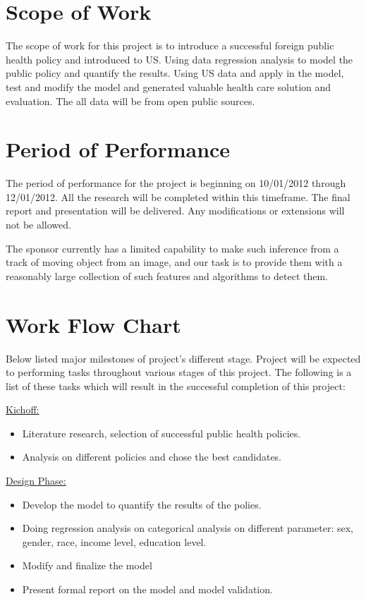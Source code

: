 \documentclass[12pt,letterpaper]{article}
\theoremstyle{definition}
\begin{document}
\section{Scope of Work}
The scope of work for this project is to introduce a successful foreign public health policy and introduced to US. Using data regression analysis to model the public policy and quantify the results. Using US data and apply in the model, test and modify the model and generated valuable health care solution and evaluation. The all data will be from open public sources.

\section{Period of Performance}
The period of performance for the project is beginning on 10/01/2012 through 12/01/2012. All the research will be completed within this timeframe. The final report and presentation will be delivered. Any modifications or extensions will not be allowed. 

The sponsor currently has a limited capability to make such inference from a
track of moving object from an image, and our task is to provide them with 
a reasonably large collection of such features and algorithms to detect them. 

\section{Work Flow Chart}
Below listed major milestones of project’s different stage. Project will be expected to performing tasks throughout various stages of this project.  The following is a list of these tasks which will result in the successful completion of this project:


\underline {Kichoff:}
\begin{itemize}
    \item Literature research, selection of successful public health policies. 
    \item Analysis on different policies and chose the best candidates. 
\end{itemize}




\underline {Design Phase:}
\begin{itemize}
    \item Develop the model to quantify the results of the polies. 
    \item Doing regression analysis on categorical analysis on different parameter: sex, gender, race, income level, education level. 
   \item Modify and finalize the model
    \item Present formal report on the model and model validation. 
\end{itemize}
\end{document}
